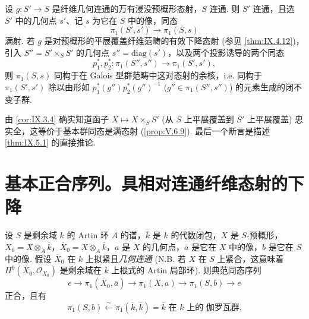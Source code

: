 \begin{corollary}\label{cor:IX.5.6}
设 $g \colon S' \to S$ 是纤维几何连通的万有浸没预概形态射，$S$ 连通. 则 $S'$ 连通，且选 $S'$ 中的几何点 $s'$、记 $s$ 为它在 $S$ 中的像，同态
\[
\pi_1(S', s') \longrightarrow \pi_1(S, s)
\]
满射. 若 $g$ 是对预概形的平展覆盖纤维范畴的有效下降态射 (参见 \ref{thm:IX.4.12})，引入 $S'' = S' \times_S S'$ 的几何点 $s'' = \mathrm{diag}(s')$，以及两个投影诱导的两个同态
\[
p_1^{*}, p_2^{*} \colon \pi_1(S'', s'') \longrightarrow \pi_1(S', s'),
\]
则 $\pi_1(S, s)$ 同构于在 Galois 型群范畴中这对态射的余核，i.e. 同构于 $\pi_1(S', s')$ 除以由形如 $p_1^{*}(g'') p_2^{*}(g'')^{-1}$ ($g'' \in \pi_1(S'', s'')$) 的元素生成的闭不变子群.
\end{corollary}

由 \ref{cor:IX.3.4} 确实知道函子 $X \mapsto X \times_S S'$ (从 $S$ 上平展覆盖到 $S'$ 上平展覆盖) 忠实全，这等价于基本群同态是满态射 (\cref{prop:V.6.9}). 最后一个断言是描述 \ref{thm:IX.5.1} 的直接推论.

\section{基本正合序列。具相对连通纤维态射的下降}

\begin{theorem}\label{thm:IX.6.1}
设 $S$ 是剩余域 $k$ 的 Artin 环 $A$ 的谱，$\overline{k}$ 是 $k$ 的代数闭包，$X$ 是 $S$-预概形，$X_0 = X \otimes_A \overline{k}$，$\overline{X}_0 = X \otimes_A \overline{k}$，$a$ 是 $X$ 的几何点，$\overline{a}$ 是它在 $X$ 中的像，$b$ 是它在 $S$ 中的像. 假设 $\overline{X}_0$ 在 $k$ 上拟紧且\emph{几何连通} (N.B. 若 $X$ 在 $S$ 上紧合，这意味着 $H^0(X_0, \mathcal{O}_{X_0})$ 是剩余域在 $k$ 上根式的 Artin 局部环). 则典范同态序列
\[
e \longrightarrow \pi_1(\overline{X}_0, \overline{a}) \longrightarrow \pi_1(X, a) \longrightarrow \pi_1(S, b) \longrightarrow e
\]
正合，且有
\[
\pi_1(S, b) \xleftarrow{\sim} \pi_1(\overline{k}, \overline{k}) = \overline{k} \text{ 在 } k \text{ 上的 伽罗瓦群}.
\]
\end{theorem}

